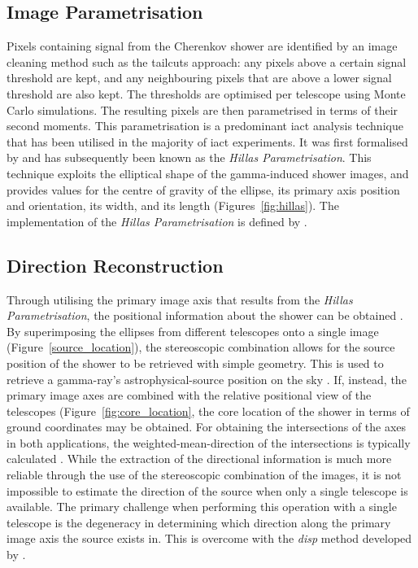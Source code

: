 \subsection{Image Parametrisation}

Pixels containing signal from the Cherenkov shower are identified by an image cleaning method such as the tailcuts approach: any pixels above a certain signal threshold are kept, and any neighbouring pixels that are above a lower signal threshold are also kept. The thresholds are optimised per telescope using Monte Carlo simulations. The resulting pixels are then parametrised in terms of their second moments. This parametrisation is a predominant \gls{iact} analysis technique that has been utilised in the majority of \gls{iact} experiments. It was first formalised by \textcite{Hillas1985a} and has subsequently been known as the \textit{Hillas Parametrisation}. This technique exploits the elliptical shape of the gamma-induced shower images, and provides values for the centre of gravity of the ellipse, its primary axis position and orientation, its width, and its length (Figures~\ref{fig:hillas}). The  implementation of the \textit{Hillas Parametrisation} is defined by \textcite{Reynolds1993}.

\subsection{Direction Reconstruction}

Through utilising the primary image axis that results from the \textit{Hillas Parametrisation}, the positional information about the shower can be obtained \cite{Daum1997,Cogan2006,Dickinson2010}. By superimposing the ellipses from different telescopes onto a single image (Figure~\ref{source_location}), the stereoscopic combination allows for the source position of the shower to be retrieved with simple geometry. This is used to retrieve a gamma-ray's astrophysical-source position on the sky . If, instead, the primary image axes are combined with the relative positional view of the telescopes (Figure~\ref{fig:core_location}, the core location of the shower in terms of ground coordinates may be obtained. For obtaining the intersections of the axes in both applications, the weighted-mean-direction of the intersections is typically calculated \cite{Eschbach2016,Bernlohr2013a}. While the extraction of the directional information is much more reliable through the use of the stereoscopic combination of the images, it is not impossible to estimate the direction of the source when only a single telescope is available. The primary challenge when performing this operation with a single telescope is the degeneracy in determining which direction along the primary image axis the source exists in. This is overcome with the \textit{disp} method developed by \textcite{Lessard2001}.

